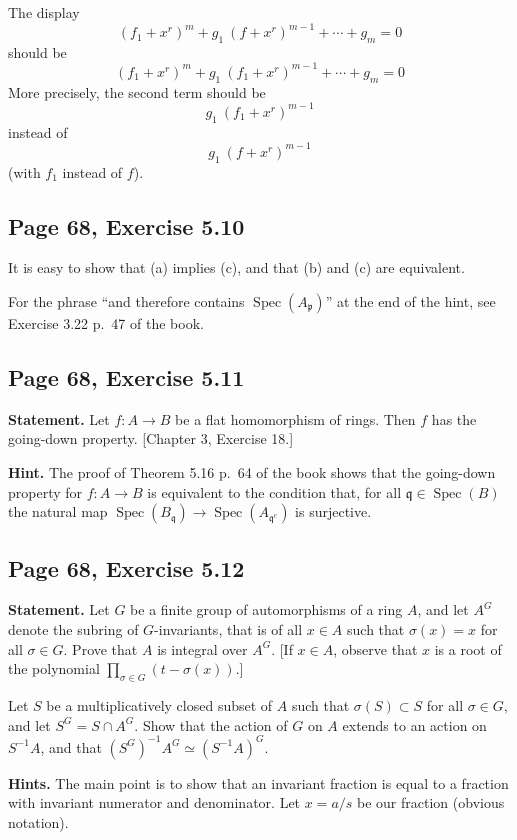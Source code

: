 \documentclass[parskip=half,fontsize=12pt]{scrartcl}%
\newcommand{\oo}{\operatorname}\newcommand{\ooo}{\operatorname*}
\newcommand{\mf}{\mathfrak}
\newcommand{\ppp}{\mf p}
\newcommand{\qqq}{\mf q}
\newcommand{\Spec}{\operatorname{Spec}}\newcommand{\Sp}{\operatorname{Spec}}
\begin{document}
The display 
$$
(f_1+x^r)^m+g_1\ (f+x^r)^{m-1}+\cdots+g_m=0
$$ 
should be 
$$
(f_1+x^r)^m+g_1\ (f_1+x^r)^{m-1}+\cdots+g_m=0
$$ 
More precisely, the second term should be $$g_1\ (f_1+x^r)^{m-1}$$ instead of $$g_1\ (f+x^r)^{m-1}$$ (with $f_1$ instead of $f$).

\subsection{Page 68, Exercise 5.10}%

It is easy to show that (a) implies (c), and that (b) and (c) are equivalent.

For the phrase ``and therefore contains $\Spec(A_\ppp)$'' at the end of the hint, see Exercise 3.22 p.~47 of the book.

\subsection{Page 68, Exercise 5.11}%

\textbf{Statement.} Let $f:A\to B$ be a flat homomorphism of rings. Then $f$ has the going-down property. [Chapter 3, Exercise 18.]

\textbf{Hint.} The proof of Theorem 5.16 p.~64 of the book shows that the going-down property for $f:A\to B$ is equivalent to the condition that, for all $\qqq\in\Spec(B)$ the natural map $\Spec(B_\qqq)\to\Spec(A_{\qqq^{\oo c}})$ is surjective. 

\subsection{Page 68, Exercise 5.12}%

\textbf{Statement.} Let $G$ be a finite group of automorphisms of a ring $A$, and let $A^G$ denote the subring of $G$-invariants, that is of all $x\in A$ such that $\sigma(x)=x$ for all $\sigma\in G$. Prove that $A$ is integral over $A^G$. [If $x\in A$, observe that $x$ is a root of the polynomial $\prod_{\sigma\in G}(t-\sigma(x))$.]

Let $S$ be a multiplicatively closed subset of $A$ such that $\sigma(S)\subset S$ for all $\sigma\in G$, and let $S^G=S\cap A^G$. Show that the action of $G$ on $A$ extends to an action on $S^{-1}A$, and that $(S^G)^{-1}A^G\simeq(S^{-1}A)^G$.

\textbf{Hints.} The main point is to show that an invariant fraction is equal to a fraction with invariant numerator and denominator. Let $x=a/s$ be our fraction (obvious notation). 
\end{document}
